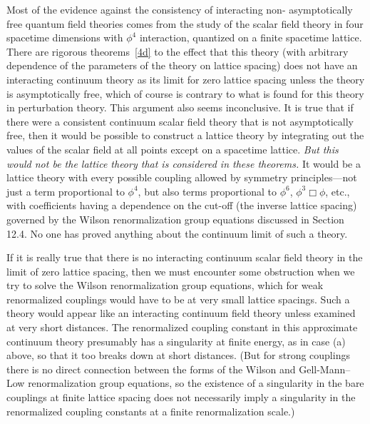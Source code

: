 Most of the evidence against the consistency of interacting non-
asymptotically free quantum field theories comes from the study of the
scalar field theory in four spacetime dimensions with $\phi^4$ interaction, quantized
on a finite spacetime lattice. There are rigorous theorems~\hyperref[ch18-ref-4d]{[4d]} to the
effect that this theory (with arbitrary dependence of the parameters of
the theory on lattice spacing) does not have an interacting continuum
theory as its limit for zero lattice spacing unless the theory is asymptotically
free, which of course is contrary to what is found for this theory
in perturbation theory. This argument also seems inconclusive. It is true
that if there were a consistent continuum scalar field theory that is not
asymptotically free, then it would be possible to construct a lattice theory
by integrating out the values of the scalar field at all points except on a
spacetime lattice. \emph{But this would not be the lattice theory that is considered
in these theorems.} It would be a lattice theory with every possible coupling
allowed by symmetry principles---not just a term proportional to $\phi^4$,
but also terms proportional to $\phi^6$, $\phi^3\Box\phi$, etc., with coefficients having a
dependence on the cut-off (the inverse lattice spacing) governed by the
Wilson renormalization group equations discussed in Section 12.4. No one
has proved anything about the continuum limit of such a theory.

If it is really true that there is no interacting continuum scalar field
theory in the limit of zero lattice spacing, then we must encounter some
obstruction when we try to solve the Wilson renormalization group equations,
which for weak renormalized couplings would have to be at very
small lattice spacings. Such a theory would appear like an interacting
continuum field theory unless examined at very short distances. The
renormalized coupling constant in this approximate continuum theory
presumably has a singularity at finite energy, as in case (a) above, so that
it too breaks down at short distances. (But for strong couplings there is no
direct connection between the forms of the Wilson and Gell-Mann--Low
renormalization group equations, so the existence of a singularity in the
bare couplings at finite lattice spacing does not necessarily imply a singularity
in the renormalized coupling constants at a finite renormalization
scale.)

